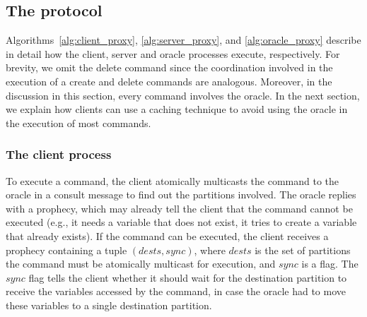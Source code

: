 \subsection{The \dynastar protocol}

Algorithms~\ref{alg:client_proxy}, \ref{alg:server_proxy}, and \ref{alg:oracle_proxy} describe in detail how the client, server and oracle processes execute, respectively. 
For brevity, we omit the delete command since the coordination involved in the execution of a create and delete commands are analogous. 
Moreover, in the discussion in this section, every command involves the oracle.
In the next section, we explain how clients can use a caching technique to avoid using the oracle in the execution of most commands.









\subsubsection{The client process} 

To execute a command, the client atomically multicasts the command to the oracle in a consult message to find out the partitions involved.
The oracle replies with a prophecy, which may already tell the client that the command cannot be executed (e.g., it needs a variable that does not exist, it tries to create a variable that already exists).
If the command can be executed, the client receives a prophecy containing a tuple $(dests, sync)$, where $dests$ is the set of partitions the command must be atomically multicast for execution, and $sync$ is a flag.
The $sync$ flag tells the client whether it should wait for the destination partition to receive the variables accessed by the command, in case the oracle had to move these variables to a single destination partition.

